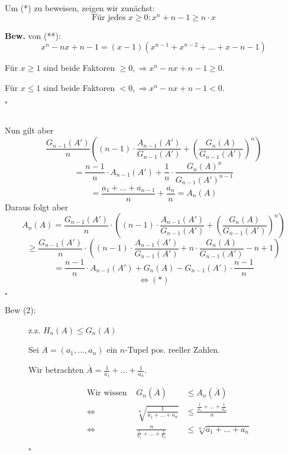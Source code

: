 \documentclass[12pt,a4paper,leqno]{article}
\begin{document}
\begin{description}
\begin{itemize}
	Um (*) zu beweisen, zeigen wir zunächst:
	\renewcommand{\theequation}{**} 
	\begin{equation}	
		\textrm{Für jedes } x \geq 0 : x ^ n + n - 1 \geq n  \cdot  x
	\end{equation}

		\textbf{Bew.} von (**): $$x ^ n - nx + n -1 = (x-1)(x ^{n-1} + x^{n-2}+...+x-n-1)$$
		
		
			Für $x \geq 1$ sind beide Faktoren $\geq 0, \Rightarrow x ^ n - nx + n - 1 \geq 0$.
			
			Für $x \leq 1$ sind beide Faktoren $< 0, \Rightarrow x ^ n - nx + n - 1 < 0$.
			\begin{flushright}$ \square $ \end{flushright}\\

	Nun gilt aber	
		$$\frac{G_{n-1}(A')}{n} \left( (n-1)\cdot  \frac{A_{n-1}(A')}{G_{n-1}(A')} + \left( \frac{G_n(A)}{G_{n-1}(A')} \right) ^{\displaystyle n} \right)$$
$$= \frac{n - 1}{n} \cdot A_{n-1}(A') + \frac{1}{n} \cdot \frac{G_n(A)^n}{G_{n-1}(A')^{n-1}}$$
$$ = \frac{a_1 + ... + a_{n-1}}{n} + \frac{a_n}{n} = A_n(A)$$
Daraus folgt aber
$$A_n(A) = \frac{G_{n-1}(A')}{n} \cdot \left( (n-1) \cdot \frac{A_{n-1}(A')}{G_{n-1}(A')} + \left( \frac{G_n(A)}{G_{n-1}(A')} \right) ^{\displaystyle n} \right) $$
\reversemarginpar {}
$$\geq 	\frac{G_{n-1}(A')}{n}\cdot \left( (n-1) \cdot \frac{A_{n-1}(A')}{G_{n-1}(A')} + n \cdot \frac{G_n(A)}{G_{n-1}(A')} - n + 1 \right)$$
$$= \frac{n-1}{n} \cdot A_{n-1}(A') + G_n(A) - G_{n-1}(A')  \cdot   \frac{n-1}{n}$$
$$ \Leftrightarrow (*)$$
\begin{flushright}$\square$\end{flushright}


\begin{description}
\item[Bew (2):] z.z. $H_n(A) \leq G_n(A)$

Sei $A=(a_1,\dotsc, a_n)$ ein $n$-Tupel pos. reeller Zahlen.

Wir betrachten $\overline{A} = \frac{1}{a_1} + ... + \frac{1}{a_n}$. 


\begin{align*}
&\textrm{Wir wissen } & G_n(\overline{A}) &\leq A_n(\overline{A}) \\
&\Leftrightarrow & \sqrt[n]{\scriptstyle \frac{1}{a_1 + \ldots + a_n}} &\leq \frac{\scriptstyle \frac{1}{a_1} + \ldots + \frac{1}{a_n}}{n} \\
&\Leftrightarrow & \frac{n}{\scriptstyle \frac{1}{a_1} + \ldots + \frac{1}{a_n}} &\leq \sqrt[n]{a_1+ \ldots + a_n}
\end{align*}
\begin{flushright}$\square$\end{flushright}
\end{description}


\end{itemize}
\end{description}
\end{document}
